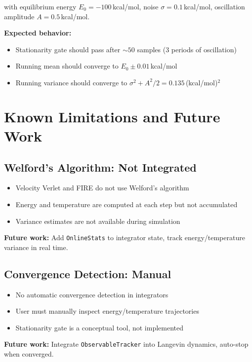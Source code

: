 \documentclass[11pt]{article}
\begin{document}
with equilibrium energy $E_0 = -100$\,kcal/mol, noise $\sigma = 0.1$\,kcal/mol, oscillation amplitude $A = 0.5$\,kcal/mol.

\textbf{Expected behavior:}
\begin{itemize}
\item Stationarity gate should pass after $\sim 50$ samples (3 periods of oscillation)
\item Running mean should converge to $E_0 \pm 0.01$\,kcal/mol
\item Running variance should converge to $\sigma^2 + A^2/2 = 0.135$\,(kcal/mol)$^2$
\end{itemize}

\section{Known Limitations and Future Work}

\subsection{Welford's Algorithm: Not Integrated}

\begin{itemize}
\item Velocity Verlet and FIRE do not use Welford's algorithm
\item Energy and temperature are computed at each step but not accumulated
\item Variance estimates are not available during simulation
\end{itemize}

\textbf{Future work:} Add \texttt{OnlineStats} to integrator state, track energy/temperature variance in real time.

\subsection{Convergence Detection: Manual}

\begin{itemize}
\item No automatic convergence detection in integrators
\item User must manually inspect energy/temperature trajectories
\item Stationarity gate is a conceptual tool, not implemented
\end{itemize}

\textbf{Future work:} Integrate \texttt{ObservableTracker} into Langevin dynamics, auto-stop when converged.
\end{document}
